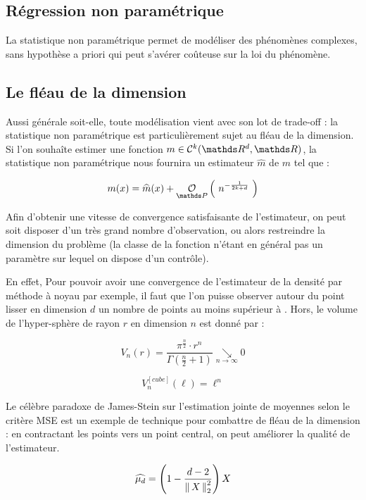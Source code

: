 \subsection*{Régression non paramétrique}

La statistique non paramétrique permet de modéliser des phénomènes complexes, sans hypothèse a priori qui peut s'avérer coûteuse sur la loi du phénomène. 

\subsection*{Le fléau de la dimension}

Aussi générale soit-elle, toute modélisation vient avec son lot de \of trade-off \fg : la statistique non paramétrique est particulièrement sujet au fléau de la dimension. Si l'on souhaîte estimer une fonction $m \in \calC^k( \R d, \grandR )$, la statistique non paramétrique nous fournira un estimateur $\widehat m$ de $m$ tel que : 

\begin{equation}
    m(x) = \widehat m(x) + \grandop{ n^{- \frac 1 {2k + d}} }
\end{equation}

Afin d'obtenir une vitesse de convergence satisfaisante de l'estimateur, on peut soit disposer d'un très grand nombre d'observation, ou alors restreindre la dimension du problème (la classe de la fonction n'étant en général pas un paramètre sur lequel on dispose d'un contrôle).


En effet,  Pour pouvoir avoir une convergence de l'estimateur de la densité par méthode à noyau par exemple, il faut que l'on puisse observer autour du point lisser en dimension $d$ un nombre de points au moins supérieur à . Hors, le volume de l'hyper-sphère de rayon $r$ en dimension $n$ est donné par :

\begin{equation}
    V_n(r) = \frac{\pi^{\frac n 2} \cdot r^{n}}{\Gamma(\frac n 2 + 1)} 
    \underset{n \rightarrow \infty} {\searrow} 0
\end{equation}

\begin{equation}
    V_n^{[cube]}(\ell) = \ell^n
\end{equation}


Le célèbre paradoxe de James-Stein sur l'estimation jointe de moyennes selon le critère MSE est un exemple de technique pour combattre de fléau de la dimension : en contractant les points vers un point central, on peut améliorer la qualité de l'estimateur. 

\begin{equation}
    \widehat {\mu_d} = \left( 1 - \frac{d - 2}{\norme 2 {X}^2} \right) X
\end{equation}


